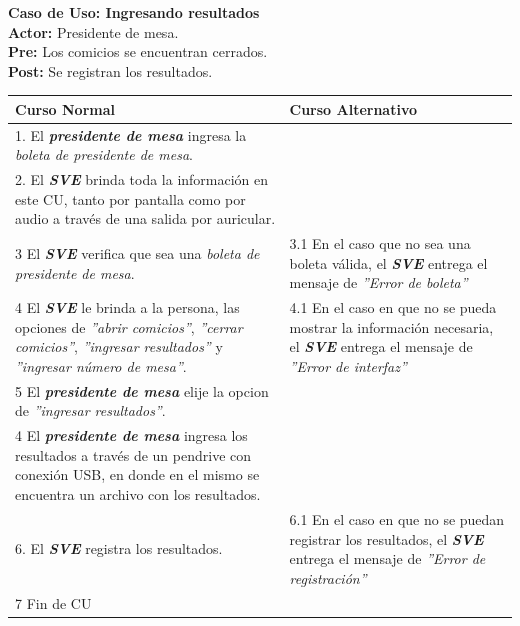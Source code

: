 \documentclass[spanish, 10pt,a4paper]{article}
\numberwithin{equation}{section} %
\begin{document}
\newpage
\noindent\textbf{Caso de Uso: Ingresando resultados}\\
\textbf{Actor: } Presidente de mesa.\\
\textbf{Pre: } Los comicios se encuentran cerrados.\\
\textbf{Post: } Se registran los resultados.\\
\begin{table}[H]
  \centering
\bgroup
\def\arraystretch{1.3}
  \begin{tabular}{p{9cm} | p{7cm}}
    \hline
    Curso Normal & Curso Alternativo \\
    \hline
    \hline    
    1. El \textbf{\textit{presidente de mesa}} ingresa la \textit{boleta de presidente de mesa}. 
    & \\
    
    \hline
    2. El \textbf{\textit{SVE}} brinda toda la información en este CU, tanto por pantalla como por audio a través de una salida por auricular.
    &
    \\
    
    \hline
    3 El \textbf{\textit{SVE}} verifica que sea una \textit{boleta de presidente de mesa}.
    & 
    3.1 En el caso que no sea una boleta válida, el \textbf{\textit{SVE}} entrega el mensaje de \textit{''Error de boleta''}
    \\
    
    \hline
    4 El \textbf{\textit{SVE}} le brinda a la persona, las opciones de \textit{''abrir comicios''}, \textit{''cerrar comicios''}, \textit{''ingresar resultados''} y \textit{''ingresar número de mesa''}.
    & 
    4.1 En el caso en que no se pueda mostrar la información necesaria, el \textbf{\textit{SVE}} entrega el mensaje de \textit{''Error de interfaz''}
    \\
    
    \hline
    5 El \textbf{\textit{presidente de mesa}} elije la opcion de \textit{''ingresar resultados''}.
    & \\
    
    \hline
    4 El \textbf{\textit{presidente de mesa}} ingresa los resultados a través de un pendrive con conexión USB, en donde en el mismo se encuentra un archivo con los resultados.
    \\
    
    \hline
    6. El \textbf{\textit{SVE}} registra los resultados.
    &
    6.1 En el caso en que no se puedan registrar los resultados, el \textbf{\textit{SVE}} entrega el mensaje de \textit{''Error de registración''}
    \\
    
    \hline
    7 Fin de CU
    & \\
    \hline
  \end{tabular}
\egroup
\end{table}
\end{document}
